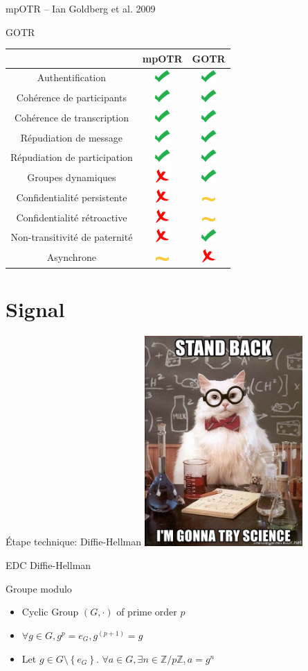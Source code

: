 \documentclass{beamer}
\newcommand{\okay}{\includegraphics[height=0.5cm]{img/check.png}}
\newcommand{\nope}{\includegraphics[height=0.5cm]{img/cross.png}}
\newcommand{\sortof}{\includegraphics[width=0.5cm]{img/tilde.png}}
\newcommand{\ZZ}{\mathbb{Z}}
\newcommand{\set}[1]{\left\{ #1 \right\}}
\begin{document}
\begin{frame}{mpOTR – Ian Goldberg et al. 2009~\cite{mpotr}}
\begin{frame}{GOTR}
	\center
  	\begin{tabular}{c|cc}
			                              & mpOTR   & GOTR    \\
			\hline
  		Authentification              & \okay   & \okay   \\
  		\hline
  		Cohérence de participants     & \okay   & \okay   \\
  		Cohérence de transcription    & \okay   & \okay   \\
  		\hline
  		Répudiation de message        & \okay   & \okay   \\
  		Répudiation de participation  & \okay   & \okay   \\
  		\hline
  		Groupes dynamiques            & \nope   & \okay   \\
  		\hline
  		Confidentialité persistente   & \nope   & \sortof \\
  		Confidentialité rétroactive   & \nope   & \sortof \\
  		Non-transitivité de paternité & \nope   & \okay   \\
  		\hline
  		Asynchrone                    & \sortof & \nope
    \end{tabular}
\end{frame}

\section{Signal}
\begin{frame}{Étape technique: Diffie-Hellman}
	\center
	\includegraphics[height=8cm]{img/stand-back-im-gonna-try-science.jpg}
\end{frame}

\begin{frame}{EDC Diffie-Hellman}
	\begin{block}{Groupe modulo}
		\begin{itemize}
			\item Cyclic Group $(G, \cdot)$ of prime order $p$
			\item $\forall g \in G, g^p = e_G, g^{(p+1)} = g$
			\item Let $g \in G\setminus \set{e_G}$. $\forall a \in G, \exists n \in \ZZ / p\ZZ, a = g^n$
		\end{itemize}
	\end{block}


\end{frame}
\end{frame}
\end{document}
